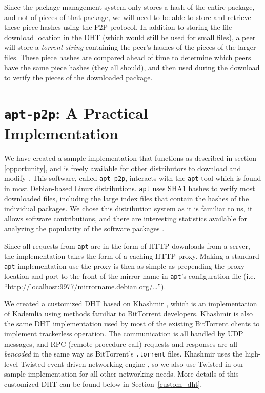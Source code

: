 \documentclass[conference]{IEEEtran}
\begin{document}
Since the package management system only stores a hash of the entire
package, and not of pieces of that package, we will need to be able
to store and retrieve these piece hashes using the P2P protocol. In
addition to storing the file download location in the DHT (which
would still be used for small files), a peer will store a
\emph{torrent string} containing the peer's hashes of the pieces of
the larger files. These piece hashes are compared ahead of time
to determine which peers have the same piece hashes (they all
should), and then used during the download to verify the pieces of
the downloaded package.


\section{\texttt{apt-p2p}: A Practical Implementation}
\label{implementation}

We have created a sample implementation that functions as described
in section \ref{opportunity}, and is freely available for other
distributors to download and modify \cite{apt-p2p}. This software,
called \texttt{apt-p2p}, interacts with the \texttt{apt} tool which
is found in most Debian-based Linux distributions. \texttt{apt} uses
SHA1 hashes to verify most downloaded files, including the large
index files that contain the hashes of the individual packages. We
chose this distribution system as it is familiar to us, it allows
software contributions, and there are interesting statistics
available for analyzing the popularity of the software packages
\cite{popcon}.

Since all requests from \texttt{apt} are in the form of HTTP downloads from a
server, the implementation takes the form of a caching HTTP proxy.
Making a standard \texttt{apt} implementation use the proxy is then
as simple as prepending the proxy location and port to the front of
the mirror name in \texttt{apt}'s configuration file (i.e.
``http://localhost:9977/mirrorname.debian.org/\ldots'').

We created a customized DHT based on Khashmir \cite{khashmir}, which
is an implementation of Kademlia \cite{kademlia} using methods
familiar to BitTorrent developers. Khashmir is also the same DHT
implementation used by most of the existing BitTorrent clients to
implement trackerless operation. The communication is all handled by
UDP messages, and RPC (remote procedure call) requests and responses
are all \emph{bencoded} in the same way as BitTorrent's
\texttt{.torrent} files. Khashmir uses the high-level Twisted
event-driven networking engine \cite{twisted}, so we also use
Twisted in our sample implementation for all other networking needs.
More details of this customized DHT can be found below in
Section~\ref{custom_dht}.
\end{document}
